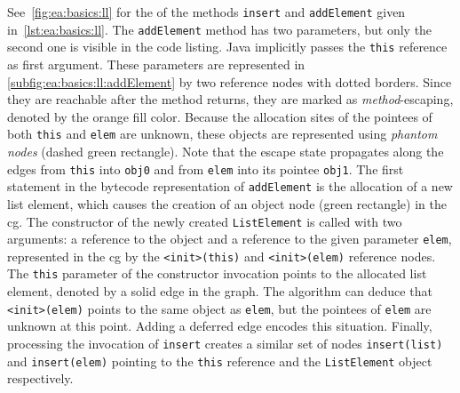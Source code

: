 			See~\cref{fig:ea:basics:ll} for the  of the methods \texttt{insert} and \texttt{addElement} given
			in~\cref{lst:ea:basics:ll}. The \texttt{addElement} method has two parameters, but only the second one is visible
			in the code listing. Java implicitly passes the \texttt{this} reference as first argument. These parameters are
			represented in \cref{subfig:ea:basics:ll:addElement} by two reference nodes with dotted borders. Since they are
			reachable after the method returns, they are marked as \emph{method}-escaping, denoted by the orange fill color.
			Because the allocation sites of the pointees of both \texttt{this} and \texttt{elem} are unknown, these objects
			are represented using \emph{phantom nodes} (dashed green rectangle). Note that the escape state propagates along
			the edges from \texttt{this} into \texttt{obj0} and from \texttt{elem} into its pointee \texttt{obj1}. The first
			statement in the bytecode representation of \texttt{addElement} is the allocation of a new list element, which
			causes the creation of an object node (green rectangle) in the \gls{cg}. The constructor of the newly created
			\texttt{ListElement} is called with two arguments: a reference to the object and a reference to the given
			parameter \texttt{elem}, represented in the \acrlong{cg} by the \texttt{<init>(this)} and \texttt{<init>(elem)}
			reference nodes. The \texttt{this} parameter of the constructor invocation points to the allocated list element,
			denoted by a solid edge in the graph. The algorithm can deduce that \texttt{<init>(elem)} points to the same
			object as \texttt{elem}, but the pointees of \texttt{elem} are unknown at this point. Adding a deferred edge
			encodes this situation. Finally, processing the invocation of \texttt{insert} creates a similar set of nodes
			\texttt{insert(list)} and \texttt{insert(elem)} pointing to the \texttt{this} reference and the
			\texttt{ListElement} object respectively.

